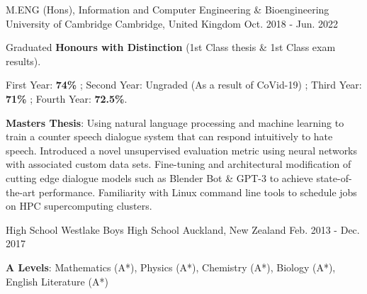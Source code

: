

\begin{cventries}

  \cventry
    {M.ENG (Hons), Information and Computer Engineering \& Bioengineering} %
    {University of Cambridge} %
    {Cambridge, United Kingdom} %
    {Oct. 2018 - Jun. 2022} %
    {
      \begin{cvitems} %
        \item {Graduated \textbf{Honours with Distinction} (1st Class thesis \& 1st Class exam results).}
        \item {First Year: \textbf{74\%} ; Second Year: Ungraded (As a result of CoVid-19) ; Third Year: \textbf{71\%} ; Fourth Year: \textbf{72.5\%}.}
        \item {\textbf{Masters Thesis}: Using natural language processing and machine learning to train a counter speech dialogue system that can respond intuitively to hate speech. Introduced a novel unsupervised evaluation metric using neural networks with associated custom data sets. Fine-tuning and architectural modification of cutting edge dialogue models such as Blender Bot \& GPT-3 to achieve state-of-the-art performance. Familiarity with Linux command line tools to schedule jobs on HPC supercomputing clusters.}
      \end{cvitems}
    }

  \cventry
    {High School} %
    {Westlake Boys High School} %
    {Auckland, New Zealand} %
    {Feb. 2013 - Dec. 2017} %
    {
      \begin{cvitems}
        \item {\textbf{A Levels}: Mathematics (A*), Physics (A*), Chemistry (A*), Biology (A*), English Literature (A*)}
      \end{cvitems}
    }

\end{cventries}
